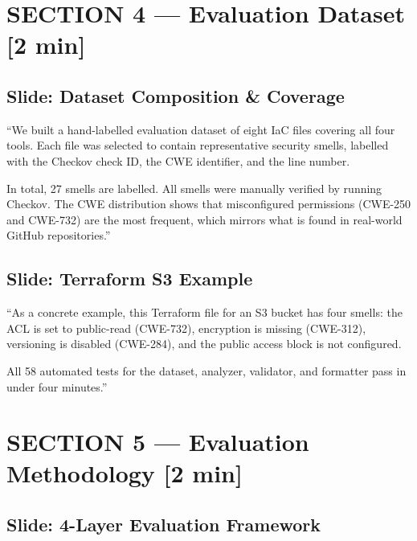 \documentclass[12pt,a4paper]{article}
\newcommand{\timing}[1]{{\color{slidegold}\textbf{[#1]}}}
\begin{document}
\section{SECTION 4 --- Evaluation Dataset \timing{2 min}}

\subsection{Slide: Dataset Composition \& Coverage}

\begin{saybox}
``We built a hand-labelled evaluation dataset of eight IaC files covering all four tools.
Each file was selected to contain representative security smells, labelled with
the Checkov check ID, the CWE identifier, and the line number.

In total, 27 smells are labelled. All smells were manually verified by running Checkov.
The CWE distribution shows that misconfigured permissions (CWE-250 and CWE-732) are
the most frequent, which mirrors what is found in real-world GitHub repositories.''
\end{saybox}

\subsection{Slide: Terraform S3 Example}

\begin{saybox}
``As a concrete example, this Terraform file for an S3 bucket has four smells:
the ACL is set to public-read (CWE-732), encryption is missing (CWE-312),
versioning is disabled (CWE-284), and the public access block is not configured.

All 58 automated tests for the dataset, analyzer, validator, and formatter pass in under four minutes.''
\end{saybox}

\section{SECTION 5 --- Evaluation Methodology \timing{2 min}}

\subsection{Slide: 4-Layer Evaluation Framework}
\end{document}
